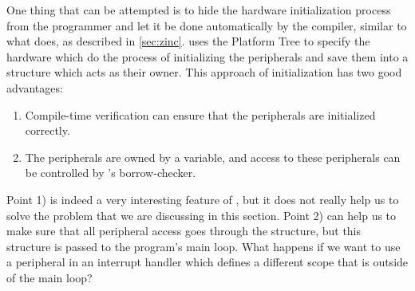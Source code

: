 One thing that can be attempted is to hide the hardware initialization process from the programmer and let it be done automatically by the compiler, similar to what {\zinc} does, as described in \autoref{sec:zinc}.
{\zinc} uses the Platform Tree to specify the hardware which do the process of initializing the peripherals and save them into a  structure which acts as their owner.
This approach of initialization has two good advantages:

\begin{enumerate}
    \item Compile-time verification can ensure that the peripherals are initialized correctly.
    \item The peripherals are owned by a variable, and access to these peripherals can be controlled by {\rust}'s borrow-checker.
\end{enumerate}

Point 1) is indeed a very interesting feature of {\zinc}, but it does not really help us to solve the problem that we are discussing in this section.
Point 2) can help us to make sure that all peripheral access goes through the  structure, but this structure is passed to the program's main loop.
What happens if we want to use a peripheral in an interrupt handler which defines a different scope that is outside of the main loop?